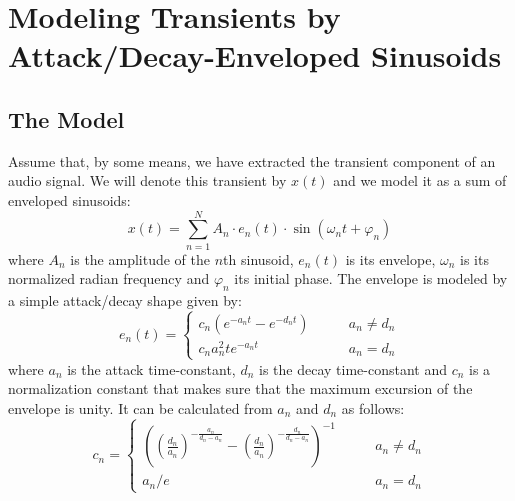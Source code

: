 \section{Modeling Transients by Attack/Decay-Enveloped Sinusoids}

\subsection{The Model}
Assume that, by some means, we have extracted the transient component of an audio signal. We will denote this transient by $x(t)$ and we model it as a sum of enveloped sinusoids:
\begin{equation}
 x(t) = \sum_{n=1}^N A_n \cdot e_n(t) \cdot \sin(\omega_n t + \varphi_n)
\end{equation}
where $A_n$ is the amplitude of the $n$th sinusoid, $e_n(t)$ is its envelope, $\omega_n$ is its normalized radian frequency and $\varphi_n$ its initial phase. The envelope is modeled by a simple attack/decay shape given by:
\begin{equation}
 e_n(t) = 
 \begin{cases}
 c_n ( e^{-a_n t} - e^{-d_n t} ) \qquad & a_n \neq  d_n  \\
 c_n a_n^2 t e^{-a_nt}           \qquad & a_n   =   d_n 
 \end{cases}
\end{equation}
where $a_n$ is the attack time-constant, $d_n$ is the decay time-constant and $c_n$ is a normalization constant that makes sure that the maximum excursion of the envelope is unity. It can be calculated from $a_n$ and $d_n$ as follows:
\begin{equation}
 c_n = 
 \begin{cases}
 \left(  \left(\frac{d_n}{a_n}\right)^{-\frac{a_n}{d_n-a_n}} -\left(\frac{d_n}{a_n}\right)^{-\frac{d_n}{d_n-a_n}} \right)^{-1}  \qquad & a_n \neq  d_n  \\
 a_n / e                                                                                                                        \qquad & a_n   =   d_n 
 \end{cases}
\end{equation}

